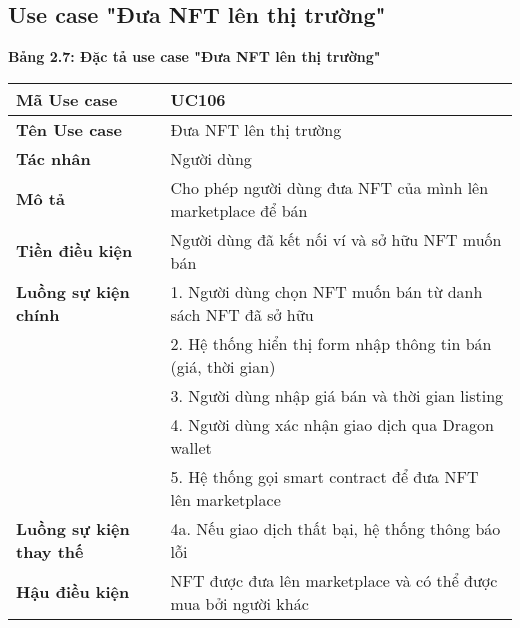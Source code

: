 \subsection{Use case "Đưa NFT lên thị trường"}
\textbf{Bảng 2.7: Đặc tả use case "Đưa NFT lên thị trường"}
\renewcommand{\arraystretch}{1.5}
\begin{tabular}{|l|p{10cm}|}
    \hline
    \rule{0pt}{3ex}\textbf{Mã Use case} & UC106 \\
    \hline
    \rule{0pt}{3ex}\textbf{Tên Use case} & Đưa NFT lên thị trường \\
    \hline
    \rule{0pt}{3ex}\textbf{Tác nhân} & Người dùng \\
    \hline
    \rule{0pt}{3ex}\textbf{Mô tả} & Cho phép người dùng đưa NFT của mình lên marketplace để bán \\
    \hline
    \rule{0pt}{3ex}\textbf{Tiền điều kiện} & Người dùng đã kết nối ví và sở hữu NFT muốn bán \\
    \hline
    \rule{0pt}{3ex}\textbf{Luồng sự kiện chính} & 1. Người dùng chọn NFT muốn bán từ danh sách NFT đã sở hữu \\
    & 2. Hệ thống hiển thị form nhập thông tin bán (giá, thời gian) \\
    & 3. Người dùng nhập giá bán và thời gian listing \\
    & 4. Người dùng xác nhận giao dịch qua Dragon wallet \\
    & 5. Hệ thống gọi smart contract để đưa NFT lên marketplace \\
    \hline
    \rule{0pt}{3ex}\textbf{Luồng sự kiện thay thế} & 4a. Nếu giao dịch thất bại, hệ thống thông báo lỗi \\
    \hline
    \rule{0pt}{3ex}\textbf{Hậu điều kiện} & NFT được đưa lên marketplace và có thể được mua bởi người khác \\
    \hline
\end{tabular}

